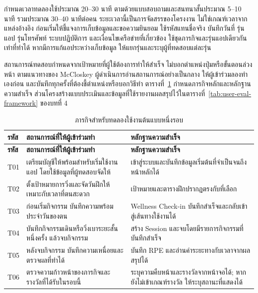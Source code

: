 กำหนดเวลาทดลองใช้ประมาณ 20--30 นาที ตามด้วยแบบสอบถามและสนทนาสั้นประมาณ 5--10 นาที รวมประมาณ 30--40 นาทีต่อคน ระยะเวลานี้เป็นการจัดสรรของโครงงาน ไม่ใช่เกณฑ์เวลาจากแหล่งอ้างอิง ก่อนเริ่มให้ชี้แจงการเก็บข้อมูลและขอความยินยอม ใช้รหัสแทนชื่อจริง บันทึกวันที่ รุ่นแอป รุ่นโทรศัพท์ ระบบปฏิบัติการ และเงื่อนไขเครือข่ายที่เกี่ยวข้อง ใช้ชุดภารกิจและรุ่นแอปเดียวกันเท่าที่ทำได้ หากมีการแก้แอประหว่างเก็บข้อมูล ให้แยกรุ่นและระบุผู้ที่ทดสอบแต่ละรุ่น

สถานการณ์ทดสอบกำหนดจากเป้าหมายที่ผู้ใช้ต้องการทำให้สำเร็จ ไม่บอกตำแหน่งปุ่มหรือขั้นตอนล่วงหน้า ตามแนวทางของ McCloskey \cite{mccloskey2014tasks} ผู้ดำเนินการอ่านสถานการณ์อย่างเป็นกลาง ให้ผู้เข้าร่วมลองทำเองก่อน และบันทึกทุกครั้งที่ต้องชี้ตำแหน่งหรือบอกวิธีทำ ตารางที่~\ref{tab:single-session-tasks} กำหนดภารกิจหลักและหลักฐานความสำเร็จ ส่วนโครงสร้างแบบประเมินและข้อมูลที่ใช้รายงานผลสรุปไว้ในตารางที่~\ref{tab:user-eval-framework} ของบทที่ 4

\begingroup
\small
\renewcommand{\arraystretch}{1.12}
\KeepTableStart
\begin{longtable}{|>{\raggedright\arraybackslash}p{}|>{\raggedright\arraybackslash}p{}|>{\raggedright\arraybackslash}p{}|}
\caption{ภารกิจสำหรับทดลองใช้งานต้นแบบหนึ่งรอบ}\label{tab:single-session-tasks}\\ \hline
\textbf{รหัส} & \textbf{สถานการณ์ที่ให้ผู้เข้าร่วมทำ} & \textbf{หลักฐานความสำเร็จ} \\ \hline
\endfirsthead
\hline \textbf{รหัส} & \textbf{สถานการณ์ที่ให้ผู้เข้าร่วมทำ} & \textbf{หลักฐานความสำเร็จ} \\ \hline
\endhead
T01 & เตรียมบัญชีให้พร้อมสำหรับเริ่มใช้งานแอป โดยใช้ข้อมูลที่ผู้ทดสอบจัดให้ & เข้าสู่ระบบและบันทึกข้อมูลเริ่มต้นที่จำเป็นจนถึงหน้าหลักได้ \\ \hline
T02 & ตั้งเป้าหมายการวิ่งและจัดวันฝึกให้เหมาะกับเวลาที่ตนสะดวก & เป้าหมายและตารางฝึกปรากฏตรงกับที่เลือก \\ \hline
T03 & ก่อนเริ่มกิจกรรม บันทึกความพร้อมประจำวันของตน & Wellness Check-in บันทึกสำเร็จและกลับเข้าสู่เส้นทางใช้งานได้ \\ \hline
T04 & บันทึกกิจกรรมเดินหรือวิ่งเบาระยะสั้นหนึ่งครั้ง แล้วจบกิจกรรม & สร้าง Session และจบโดยมีรายการกิจกรรมที่บันทึกสำเร็จ \\ \hline
T05 & หลังจบกิจกรรม บันทึกความเหนื่อยและตรวจผลที่ทำได้ & บันทึก RPE และอ่านค่าระยะทางกับเวลาจากผลสรุปได้ \\ \hline
T06 & ตรวจความก้าวหน้าของภารกิจและรางวัลที่ได้รับในรอบนี้ & ระบุความคืบหน้าและรางวัลจากหน้าจอได้; หากยังไม่เข้าเกณฑ์รางวัล ให้ระบุสถานะที่แสดงได้ \\ \hline
\end{longtable}
\endgroup

